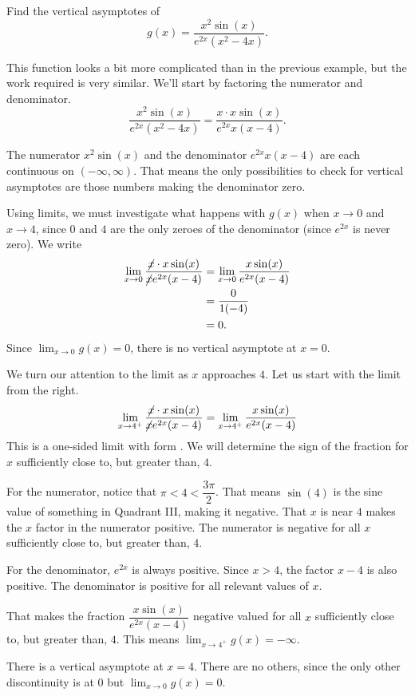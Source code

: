 \documentclass{ximera}
\begin{document}
\begin{example}
	Find the vertical asymptotes of 
	\[ g(x) = \frac{x^2\sin(x)}{e^{2x}\left(x^2-4x\right)}. \]

	\begin{explanation}
		This function looks a bit more complicated than in the previous example, but the work required is very similar. We'll start
		by factoring the numerator and denominator.
		\[ \frac{x^2\sin(x)}{e^{2x}\left(x^2-4x\right)} = \frac{x\cdot x\sin(x)}{e^{2x}x\left(x-4\right)}.\]
		
		The numerator $x^2\sin(x)$ and the denominator $e^{2x}x(x-4)$ are each continuous on $(-\infty, \infty)$. That means the only
		possibilities to check for vertical asymptotes are those numbers making the denominator zero.
		
		Using limits, we must investigate what happens with $g(x)$ when $x\to 0$ and $x\to 4$, since $0$ and $4$ are the only zeroes of the 				denominator (since $e^{2x}$ is never zero). We write
		\begin{align*}
			\lim_{x\to 0} \frac{\cancel{x}\cdot x\sin(x)}{\cancel{x}e^{2x}(x-4)} &= \lim_{x\to 0} \frac{x\sin(x)}{e^{2x}(x-4)}\\
				&= \frac{0}{1(-4)}\\
				&=0.
		\end{align*}
		Since $\displaystyle \lim_{x\to 0}g(x)=0$, there is no vertical asymptote at $x=0$. 
		
		We turn our attention to the limit as $x$ approaches $4$. Let us start with the limit from the right.		
		\[ \lim_{x\to 4^+} \frac{\cancel{x}\cdot x\sin(x)}{\cancel{x}e^{2x}(x-4)} = \lim_{x\to 4^+} \frac{x\sin(x)}{e^{2x}(x-4)} \]
		This is a one-sided limit with form \numOverZero. We will determine the sign of the fraction for $x$ sufficiently close to, 
		but greater than, $4$.
		
		For the numerator, notice that $\pi < 4 < \dfrac{3\pi}{2}$. That means $\sin(4)$ is the sine value of something in Quadrant III, 
		making it negative. That $x$ is near $4$ makes the $x$ factor in the numerator positive. The numerator is negative for all $x$ sufficiently
		close to, but greater than, $4$.
		  
		For the denominator, $e^{2x}$ is always positive. Since $x>4$, the factor $x-4$ is also positive. The denominator is positive for all 
		relevant values of $x$.
		
		That makes the fraction $\dfrac{x\sin(x)}{e^{2x}(x-4)}$ negative valued for all $x$ sufficiently close to, but greater than, $4$.
		This means $\displaystyle \lim_{x\to 4^+} g(x) = -\infty$.
		
		There is a vertical asymptote at $x=4$. There are no others, since the only other discontinuity is at $0$ but $\displaystyle \lim_{x\to 0}g(x)=0$.
		
		
	\end{explanation}

\end{example}
\end{document}
